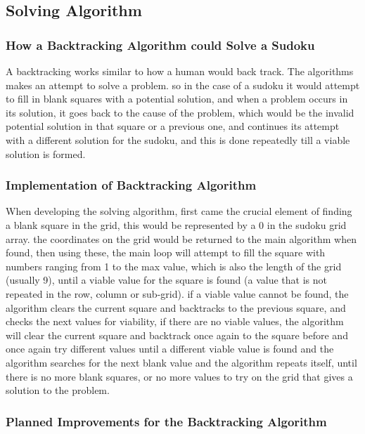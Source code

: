 \documentclass[]{final_report}
\begin{document}
\subsection*{Solving Algorithm} 

\subsubsection{How a Backtracking Algorithm could Solve a Sudoku} 

A backtracking works similar to how a human would back track. The algorithms makes an attempt to solve a problem. so in the case of a sudoku it would attempt to fill in blank squares with a potential solution, and when a problem occurs in its solution, it goes back to the cause of the problem, which would be the invalid potential solution in that square or a previous one, and continues its attempt with a different solution for the sudoku, and this is done repeatedly till a viable solution is formed.  

\subsubsection{Implementation of Backtracking Algorithm} 

When developing the solving algorithm, first came the crucial element of finding a blank square in the grid, this would be represented by a 0 in the sudoku grid array. the coordinates on the grid would be returned to the main algorithm when found, then using these, the main loop will attempt to fill the square with numbers ranging from 1 to the max value, which is also the length of the grid (usually 9), until a viable value for the square is found (a value that is not repeated in the row, column or sub-grid). if a viable value cannot be found, the algorithm clears the current square and backtracks to the previous square, and checks the next values for viability, if there are no viable values, the algorithm will clear the current square and backtrack once again to the square before and once again try different values until a different viable value is found and the algorithm searches for the next blank value and the algorithm repeats itself, until there is no more blank squares, or no more values to try on the grid that gives a solution to the problem. 

\subsubsection{Planned Improvements for the Backtracking Algorithm} 
\end{document}
